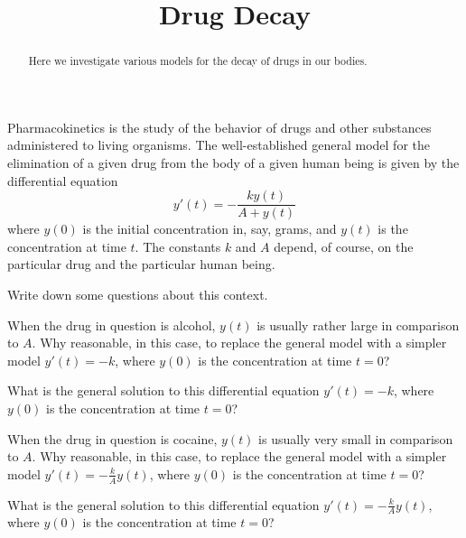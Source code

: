 \documentclass[,nooutcomes]{ximera}
\title{Drug Decay}
\begin{document}
\begin{abstract}
Here we investigate various models for the decay of drugs in our bodies.  
\end{abstract}
\maketitle

Pharmacokinetics is the study of the behavior of drugs and other substances administered to living organisms.  
The well-established general model for 
the elimination of a given drug from the body of a given human being is given by the differential equation 
$$y'(t)=-\frac{ky(t)}{A+y(t)}$$
where $y(0)$ is the initial concentration in, say, grams, and $y(t)$ is the concentration at time $t$.  The constants $k$ and $A$ depend, of course, on the particular drug and the particular human being. 

\begin{question}
Write down some questions about this context.       
\begin{freeResponse}
\end{freeResponse}
\end{question}


\begin{question}
When the drug in question is alcohol, $y(t)$ is usually rather large in comparison to $A$.   Why reasonable, in this case, to replace the general model with a simpler model $y'(t)=-k$, where $y(0)$ is the concentration at time $t=0$?  
\begin{freeResponse}
\end{freeResponse}
\end{question}

\begin{question}
What is the general solution to this differential equation $y'(t)=-k$, where $y(0)$ is the concentration at time $t=0$?  
\begin{freeResponse}
\end{freeResponse}
\end{question}

\begin{question}
When the drug in question is cocaine, $y(t)$ is usually very small in comparison to $A$.   Why reasonable, in this case, to replace the general model with a simpler model $y'(t)=-\frac{k}{A}y(t)$, where $y(0)$ is the concentration at time $t=0$?  
\begin{freeResponse}
\end{freeResponse}
\end{question}

\begin{question}
What is the general solution to this differential equation $y'(t)=-\frac{k}{A}y(t)$, where $y(0)$ is the concentration at time $t=0$?  
\begin{freeResponse}
\end{freeResponse}
\end{question}
\end{document}
